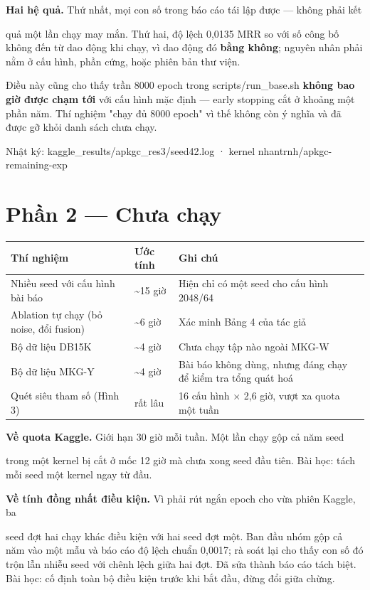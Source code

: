 \documentclass[11pt,a4paper]{article}
\newcommand{\code}[1]{{\ttfamily\small\color{codetext}#1}}
\begin{document}
\textbf{Hai hệ quả.} Thứ nhất, mọi con số trong báo cáo tái lập được --- không phải kết

quả một lần chạy may mắn. Thứ hai, độ lệch 0,0135 MRR so với số công bố không đến từ dao động khi chạy, vì dao động đó \textbf{bằng không}; nguyên nhân phải nằm ở cấu hình, phần cứng, hoặc phiên bản thư viện.

Điều này cũng cho thấy trần 8000 epoch trong \code{scripts/run\_base.sh} \textbf{không bao giờ được chạm tới} với cấu hình mặc định --- early stopping cắt ở khoảng một phần năm. Thí nghiệm "chạy đủ 8000 epoch" vì thế không còn ý nghĩa và đã được gỡ khỏi danh sách chưa chạy.

Nhật ký: \code{kaggle\_results/apkgc\_res3/seed42.log} · kernel \code{nhantrnh/apkgc-remaining-exp}

\section{Phần 2 --- Chưa chạy}
\begin{center}\small
\begin{tabular}{@{}lll@{}}
\toprule
\textbf{Thí nghiệm} & \textbf{Ước tính} & \textbf{Ghi chú}\\
\midrule
Nhiều seed với cấu hình bài báo & \textasciitilde{}15 giờ & Hiện chỉ có một seed cho cấu hình 2048/64\\
Ablation tự chạy (bỏ noise, đổi fusion) & \textasciitilde{}6 giờ & Xác minh Bảng 4 của tác giả\\
Bộ dữ liệu DB15K & \textasciitilde{}4 giờ & Chưa chạy tập nào ngoài MKG-W\\
Bộ dữ liệu MKG-Y & \textasciitilde{}4 giờ & Bài báo không dùng, nhưng đáng chạy để kiểm tra tổng quát hoá\\
Quét siêu tham số (Hình 3) & rất lâu & 16 cấu hình $\times$ 2,6 giờ, vượt xa quota một tuần\\
\bottomrule
\end{tabular}
\end{center}
\textbf{Về quota Kaggle.} Giới hạn 30 giờ mỗi tuần. Một lần chạy gộp cả năm seed

trong một kernel bị cắt ở mốc 12 giờ mà chưa xong seed đầu tiên. Bài học: tách mỗi seed một kernel ngay từ đầu.

\textbf{Về tính đồng nhất điều kiện.} Vì phải rút ngắn epoch cho vừa phiên Kaggle, ba

seed đợt hai chạy khác điều kiện với hai seed đợt một. Ban đầu nhóm gộp cả năm vào một mẫu và báo cáo độ lệch chuẩn 0,0017; rà soát lại cho thấy con số đó trộn lẫn nhiễu seed với chênh lệch giữa hai đợt. Đã sửa thành báo cáo tách biệt. Bài học: cố định toàn bộ điều kiện trước khi bắt đầu, đừng đổi giữa chừng.
\end{document}
